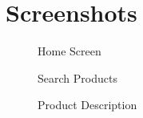 \documentclass[11pt]{report}
\begin{document}
\chapter{Screenshots}
\begin{figure}[H]
	\caption{Home Screen}
	\label{fig:erd}
\end{figure} 
\begin{figure}[H]
	\caption{Search Products}
	\label{fig:dfd}
\end{figure}
\begin{figure}[H]
	\caption{Product Description}
	\label{fig:dfd2}
\end{figure}
\end{document}
